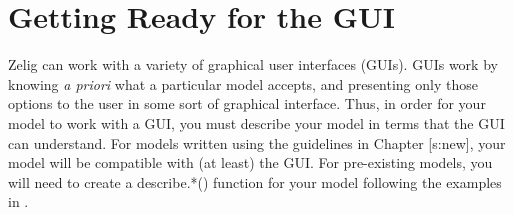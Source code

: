 \documentclass[letterpaper,10pt,english]{sphinxmanual}
\begin{document}
\section{Getting Ready for the GUI}
\label{9_adding_models_and_methods:getting-ready-for-the-gui}
Zelig can work with a variety of graphical user interfaces (GUIs). GUIs
work by knowing \emph{a priori} what a particular model accepts, and
presenting only those options to the user in some sort of graphical
interface. Thus, in order for your model to work with a GUI, you must
describe your model in terms that the GUI can understand. For models
written using the guidelines in Chapter {[}s:new{]}, your model will be
compatible with (at least) the GUI. For pre-existing models, you will
need to create a describe.*() function for your model following the
examples in .
\end{document}
